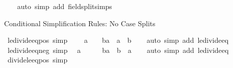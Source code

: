 \begin{isabellebody}
%
\isadelimproof
\ \ %
\endisadelimproof
%
\isatagproof
{}\isamarkupfalse%
\ {\isacharparenleft}{\kern0pt}auto\ simp\ add{\isacharcolon}{\kern0pt}\ field{\isacharunderscore}{\kern0pt}split{\isacharunderscore}{\kern0pt}simps{\isacharparenright}{\kern0pt}%
\endisatagproof
{\isafoldproof}%
%
\isadelimproof
%
\endisadelimproof
%
\begin{isamarkuptext}%
Conditional Simplification Rules: No Case Splits%
\end{isamarkuptext}\isamarkuptrue%
\isamarkupfalse%
\ le{\isacharunderscore}{\kern0pt}divide{\isacharunderscore}{\kern0pt}eq{\isacharunderscore}{\kern0pt}{}{\isacharunderscore}{\kern0pt}pos\ {\isacharbrackleft}{\kern0pt}simp{\isacharbrackright}{\kern0pt}{\isacharcolon}{\kern0pt}\isanewline
\ \ {\isachardoublequoteopen}{}\ {\isacharless}{\kern0pt}\ a\ {\isasymLongrightarrow}\ {\isacharparenleft}{\kern0pt}{}\ {\isasymle}\ b{\isacharslash}{\kern0pt}a{\isacharparenright}{\kern0pt}\ {\isacharequal}{\kern0pt}\ {\isacharparenleft}{\kern0pt}a\ {\isasymle}\ b{\isacharparenright}{\kern0pt}{\isachardoublequoteclose}\isanewline
%
\isadelimproof
\ \ %
\endisadelimproof
%
\isatagproof
{}\isamarkupfalse%
\ {\isacharparenleft}{\kern0pt}auto\ simp\ add{\isacharcolon}{\kern0pt}\ le{\isacharunderscore}{\kern0pt}divide{\isacharunderscore}{\kern0pt}eq{\isacharparenright}{\kern0pt}%
\endisatagproof
{\isafoldproof}%
%
\isadelimproof
\isanewline
%
\endisadelimproof
\isanewline
{}\isamarkupfalse%
\ le{\isacharunderscore}{\kern0pt}divide{\isacharunderscore}{\kern0pt}eq{\isacharunderscore}{\kern0pt}{}{\isacharunderscore}{\kern0pt}neg\ {\isacharbrackleft}{\kern0pt}simp{\isacharbrackright}{\kern0pt}{\isacharcolon}{\kern0pt}\isanewline
\ \ {\isachardoublequoteopen}a\ {\isacharless}{\kern0pt}\ {}\ {\isasymLongrightarrow}\ {\isacharparenleft}{\kern0pt}{}\ {\isasymle}\ b{\isacharslash}{\kern0pt}a{\isacharparenright}{\kern0pt}\ {\isacharequal}{\kern0pt}\ {\isacharparenleft}{\kern0pt}b\ {\isasymle}\ a{\isacharparenright}{\kern0pt}{\isachardoublequoteclose}\isanewline
%
\isadelimproof
\ \ %
\endisadelimproof
%
\isatagproof
{}\isamarkupfalse%
\ {\isacharparenleft}{\kern0pt}auto\ simp\ add{\isacharcolon}{\kern0pt}\ le{\isacharunderscore}{\kern0pt}divide{\isacharunderscore}{\kern0pt}eq{\isacharparenright}{\kern0pt}%
\endisatagproof
{\isafoldproof}%
%
\isadelimproof
\isanewline
%
\endisadelimproof
\isanewline
{}\isamarkupfalse%
\ divide{\isacharunderscore}{\kern0pt}le{\isacharunderscore}{\kern0pt}eq{\isacharunderscore}{\kern0pt}{}{\isacharunderscore}{\kern0pt}pos\ {\isacharbrackleft}{\kern0pt}simp{\isacharbrackright}{\kern0pt}{\isacharcolon}{\kern0pt}\isanewline

\end{isabellebody}

